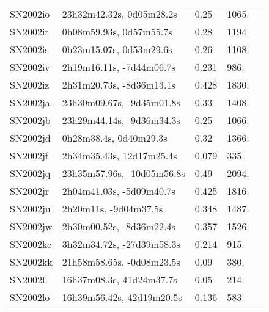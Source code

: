 \begin{longtable}{lllll}
         SN2002io &       23h32m42.32s, 0d05m28.2s &     0.25 &          1065. &    \citet{2002IAUC.8020A...1M} \\
         SN2002ir &        0h08m59.93s, 0d57m55.7s &     0.28 &          1194. &    \citet{2002IAUC.8020A...1M} \\
         SN2002is &        0h23m15.07s, 0d53m29.6s &     0.26 &          1108. &    \citet{2002IAUC.8020A...1M} \\
         SN2002iv &       2h19m16.11s, -7d44m06.7s &    0.231 &           986. &    \citet{2007ApJ...666..674M} \\
         SN2002iz &       2h31m20.73s, -8d36m13.1s &    0.428 &          1830. &    \citet{2006AJ....131.1648B} \\
         SN2002ja &      23h30m09.67s, -9d35m01.8s &     0.33 &          1408. &    \citet{2006AJ....131.1648B} \\
         SN2002jb &      23h29m44.14s, -9d36m34.3s &     0.25 &          1066. &    \citet{2006AJ....131.1648B} \\
         SN2002jd &         0h28m38.4s, 0d40m29.3s &     0.32 &          1366. &    \citet{2006AJ....131.1648B} \\
         SN2002jf &       2h34m35.43s, 12d17m25.4s &    0.079 &           335. &    \citet{2002IAUC.8027B...1H} \\
         SN2002jq &     23h35m57.96s, -10d05m56.8s &     0.49 &          2094. &    \citet{2006AJ....131.1648B} \\
         SN2002jr &       2h04m41.03s, -5d09m40.7s &    0.425 &          1816. &    \citet{2007ApJ...666..694W} \\
         SN2002ju &          2h20m11s, -9d04m37.5s &    0.348 &          1487. &    \citet{2007ApJ...666..674M} \\
         SN2002jw &       2h30m00.52s, -8d36m22.4s &    0.357 &          1526. &    \citet{2006AJ....131.1648B} \\
         SN2002kc &      3h32m34.72s, -27d39m58.3s &    0.214 &           915. &  \citet{2010AandA...512A..12B} \\
         SN2002kk &      21h58m58.65s, -0d08m23.5s &     0.09 &           380. &    \citet{2003IAUC.8066A...1W} \\
         SN2002ll &       16h37m08.3s, 41d24m37.7s &     0.05 &           214. &    \citet{2003IAUC.8181A...1R} \\
         SN2002lo &      16h39m56.42s, 42d19m20.5s &    0.136 &           583. &    \citet{2009ApJ...695..135A} \\

\end{longtable}
